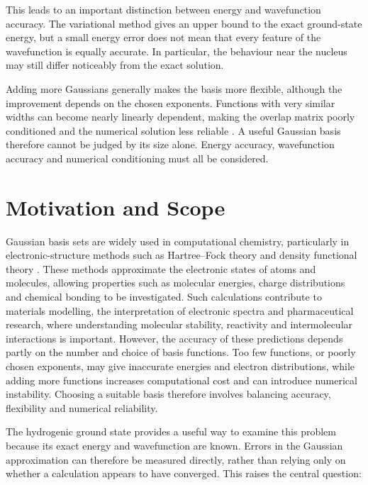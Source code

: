 This leads to an important distinction between
energy and wavefunction accuracy. The variational
method gives an upper bound to the exact
ground-state energy, but a small energy error
does not mean that every feature of the
wavefunction is equally accurate. In particular,
the behaviour near the nucleus may still differ
noticeably from the exact solution.

Adding more Gaussians generally makes the basis
more flexible, although the improvement depends
on the chosen exponents. Functions with very
similar widths can become nearly linearly
dependent, making the overlap matrix poorly
conditioned and the numerical solution less
reliable \cite{Lehtola2019}.
A useful Gaussian basis therefore cannot be
judged by its size alone. Energy accuracy,
wavefunction accuracy and numerical conditioning
must all be considered.




\section{Motivation and Scope}

Gaussian basis sets are widely used in computational
chemistry, particularly in electronic-structure
methods such as Hartree--Fock theory and density
functional theory \cite{Atkins}. These methods approximate
the electronic states of atoms and molecules,
allowing properties such as molecular energies,
charge distributions and chemical bonding to
be investigated. Such calculations contribute
to materials modelling, the interpretation of
electronic spectra and pharmaceutical research,
where understanding molecular stability,
reactivity and intermolecular interactions
is important. However, the accuracy of these
predictions depends partly on the number
and choice of basis functions. Too few functions,
or poorly chosen exponents, may give inaccurate
energies and electron distributions, while adding
more functions increases computational cost and
can introduce numerical instability. Choosing a
suitable basis therefore involves balancing
accuracy, flexibility and numerical reliability.

The hydrogenic ground state provides a useful
way to examine this problem because its exact
energy and wavefunction are known. Errors in the
Gaussian approximation can therefore be measured
directly, rather than relying only on whether
a calculation appears to have converged. This raises the 
central question:

